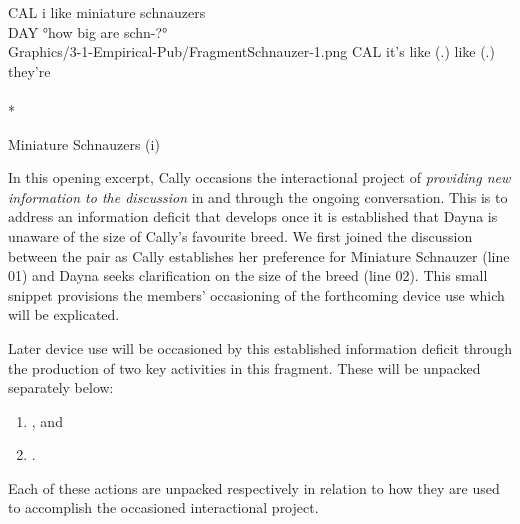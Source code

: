 \newpage
\begin{inlinefrag*} 
    {
    \begin{transcript*}
        \by CAL {i like miniature schnauzers} \\
        \by DAY {°how big are schn-?°} \\
           {Graphics/3-1-Empirical-Pub/FragmentSchnauzer-1.png}
        \by CAL {it's like (.) like (.) they're} \\
         \\*
    \end{transcript*}
    \caption{Miniature Schnauzers (i)}\label{frag:empirical pub findings newinfo-i}
    }
\end{inlinefrag*}

\begin{revisedsubmission}
In this opening excerpt, Cally occasions the interactional project of \textit{providing new information to the discussion} in and through the ongoing conversation.
This is to address an information deficit that develops once it is established that Dayna is unaware of the size of Cally's favourite breed.
We first joined the discussion between the pair as Cally establishes her preference for Miniature Schnauzer (line 01) and Dayna seeks clarification on the size of the breed (line 02).
This small snippet provisions the members' occasioning of the forthcoming device use which will be explicated.

Later device use will be occasioned by this established information deficit through the production of two key activities in this fragment.
These will be unpacked separately below:
\begin{enumerate}[label=(\roman*)]
    \item {}, and
    \item {}.
\end{enumerate}
Each of these actions are unpacked respectively in relation to how they are used to accomplish the occasioned interactional project.
\end{revisedsubmission}






